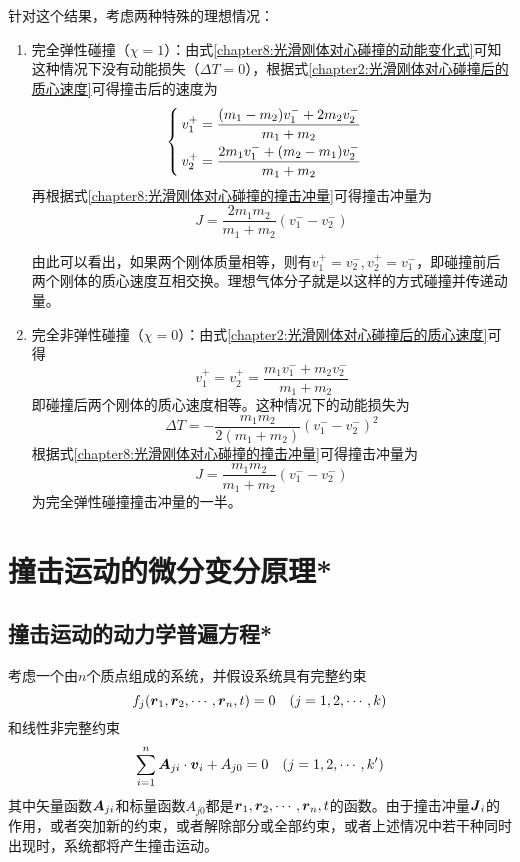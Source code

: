 针对这个结果，考虑两种特殊的理想情况：
\begin{enumerate}
\item 完全弹性碰撞（$\chi=1$）：由式\eqref{chapter8:光滑刚体对心碰撞的动能变化式}可知这种情况下没有动能损失（$\Delta T=0$），根据式\eqref{chapter2:光滑刚体对心碰撞后的质心速度}可得撞击后的速度为
\begin{equation}
\begin{cases}
	\displaystyle v_1^+ = \frac{(m_1-m_2)v_1^-+2m_2v_2^-}{m_1+m_2} \\[1.5ex]
	\displaystyle v_2^+ = \frac{2m_1v_1^-+(m_2-m_1)v_2^-}{m_1+m_2}
\end{cases}
\end{equation}
再根据式\eqref{chapter8:光滑刚体对心碰撞的撞击冲量}可得撞击冲量为
\begin{equation}
	J = \frac{2m_1m_2}{m_1+m_2}(v_1^--v_2^-)
\end{equation}

由此可以看出，如果两个刚体质量相等，则有$v_1^+=v_2^-, v_2^+=v_1^-$，即碰撞前后两个刚体的质心速度互相交换。理想气体分子就是以这样的方式碰撞并传递动量。

\item 完全非弹性碰撞（$\chi=0$）：由式\eqref{chapter2:光滑刚体对心碰撞后的质心速度}可得
\begin{equation}
	v_1^+=v_2^+ =\frac{m_1v_1^-+m_2v_2^-}{m_1+m_2}
\end{equation}
即碰撞后两个刚体的质心速度相等。这种情况下的动能损失为
\begin{equation}
	\Delta T = -\frac{m_1m_2}{2(m_1+m_2)}(v_1^--v_2^-)^2
\end{equation}
根据式\eqref{chapter8:光滑刚体对心碰撞的撞击冲量}可得撞击冲量为
\begin{equation}
	J = \frac{m_1m_2}{m_1+m_2}(v_1^--v_2^-)
\end{equation}
为完全弹性碰撞撞击冲量的一半。
\end{enumerate}

\section{撞击运动的微分变分原理*}

\subsection{撞击运动的动力学普遍方程*}

考虑一个由$n$个质点组成的系统，并假设系统具有完整约束
\begin{equation}
	f_j(\boldsymbol{r}_1,\boldsymbol{r}_2,\cdots,\boldsymbol{r}_n,t) = 0\quad (j=1,2,\cdots,k)
	\label{chapter8:完整约束-重写}
\end{equation}
和线性非完整约束
\begin{equation}
	\sum_{i=1}^n \boldsymbol{A}_{ji}\cdot \boldsymbol{v}_i + A_{j0} = 0\quad (j=1,2,\cdots,k')
	\label{chapter8:线性非完整约束-重写}
\end{equation}
其中矢量函数$\boldsymbol{A}_{ji}$和标量函数$A_{j0}$都是$\boldsymbol{r}_1,\boldsymbol{r}_2,\cdots,\boldsymbol{r}_n,t$的函数。由于撞击冲量$\boldsymbol{J}_i$的作用，或者突加新的约束，或者解除部分或全部约束，或者上述情况中若干种同时出现时，系统都将产生撞击运动。

